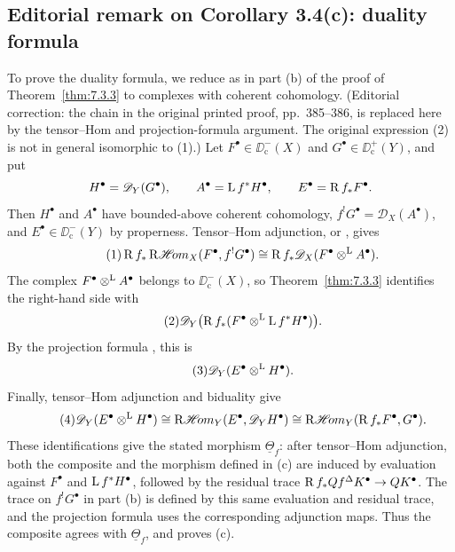 \subsection*{Editorial remark on Corollary 3.4(c): duality formula}
To prove the duality formula, we reduce as in part (b) of the proof of Theorem~\ref{thm:7.3.3} to complexes with coherent cohomology. (Editorial correction: the chain in the original printed proof, pp.~385--386, is replaced here by the tensor--Hom and projection-formula argument. The original expression (2) is not in general isomorphic to (1).)
Let $F^\bullet\in\DD_{\mathrm{c}}^-(X)$ and $G^\bullet\in\DD_{\mathrm{c}}^+(Y)$, and put
\[
H^\bullet=\mathscr{D}_Y(G^\bullet),\qquad
A^\bullet=\operatorname{L} f^*H^\bullet,\qquad E^\bullet=\operatorname{R} f_*F^\bullet.
\]
Then $H^\bullet$ and $A^\bullet$ have bounded-above coherent cohomology,
$f^!G^\bullet=\mathscr{D}_X(A^\bullet)$, and $E^\bullet\in\DD_{\mathrm{c}}^-(Y)$
by properness. Tensor--Hom adjunction, or , gives
\begin{equation}\tag{1}\label{eq:7.3.4.1}
\operatorname{R} f_*\mathop{\mathrm{R}\mathscr{H}\!om}\nolimits_X(F^\bullet,f^!G^\bullet)
\cong\operatorname{R} f_*\mathscr{D}_X(F^\bullet\mathbin{\otimes^{\mathrm{L}}} A^\bullet).
\end{equation}
The complex $F^\bullet\mathbin{\otimes^{\mathrm{L}}} A^\bullet$ belongs to $\DD_{\mathrm{c}}^-(X)$,
so Theorem~\ref{thm:7.3.3} identifies the right-hand side with
\begin{equation}\tag{2}\label{eq:7.3.4.2}
\mathscr{D}_Y\bigl(\operatorname{R} f_*(F^\bullet\mathbin{\otimes^{\mathrm{L}}}\operatorname{L} f^*H^\bullet)\bigr).
\end{equation}
By the projection formula , this is
\begin{equation}\tag{3}\label{eq:7.3.4.3}
\mathscr{D}_Y(E^\bullet\mathbin{\otimes^{\mathrm{L}}} H^\bullet).
\end{equation}
Finally, tensor--Hom adjunction and biduality  give
\begin{equation}\tag{4}\label{eq:7.3.4.4}
\mathscr{D}_Y(E^\bullet\mathbin{\otimes^{\mathrm{L}}} H^\bullet)
\cong\mathop{\mathrm{R}\mathscr{H}\!om}\nolimits_Y(E^\bullet,\mathscr{D}_YH^\bullet)
\cong\mathop{\mathrm{R}\mathscr{H}\!om}\nolimits_Y(\operatorname{R} f_*F^\bullet,G^\bullet).
\end{equation}
These identifications give the stated morphism $\underline{\Theta}_f$:
after tensor--Hom adjunction, both the composite and the morphism defined
in (c) are induced by evaluation against $F^\bullet$ and $\operatorname{L} f^*H^\bullet$,
followed by the residual trace $\operatorname{R} f_*Qf^\Delta K^\bullet\to QK^\bullet$.
The trace on $f^!G^\bullet$ in part (b) is defined by this same evaluation
and residual trace, and the projection formula uses the corresponding
adjunction maps. Thus the composite agrees with $\underline{\Theta}_f$,
and proves (c).



